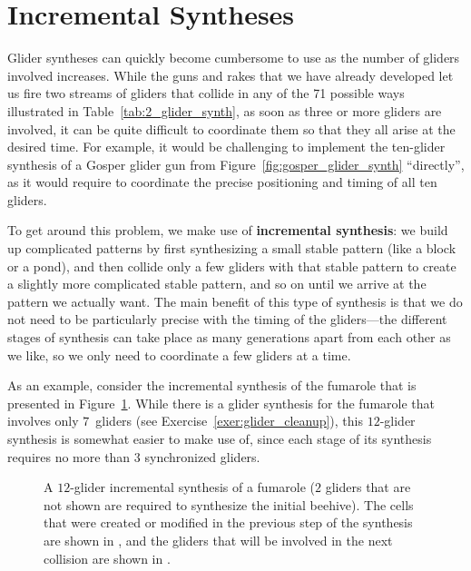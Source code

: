 \section{Incremental Syntheses}\label{sec:incremental_synthesis}

Glider syntheses can quickly become cumbersome to use as the number of gliders involved increases. While the guns and rakes that we have already developed let us fire two streams of gliders that collide in any of the 71 possible ways illustrated in Table~\ref{tab:2_glider_synth}, as soon as three or more gliders are involved, it can be quite difficult to coordinate them so that they all arise at the desired time. For example, it would be challenging to implement the ten-glider synthesis of a Gosper glider gun from Figure~\ref{fig:gosper_glider_synth} ``directly'', as it would require to coordinate the precise positioning and timing of all ten gliders.

To get around this problem, we make use of \textbf{incremental synthesis}: we build up complicated patterns by first synthesizing a small stable pattern (like a block or a pond), and then collide only a few gliders with that stable pattern to create a slightly more complicated stable pattern, and so on until we arrive at the pattern we actually want. The main benefit of this type of synthesis is that we do not need to be particularly precise with the timing of the gliders---the different stages of synthesis can take place as many generations apart from each other as we like, so we only need to coordinate a few gliders at a time.

As an example, consider the incremental synthesis of the fumarole that is presented in Figure~\ref{fig:fumarole_sequential}. While there is a glider synthesis for the fumarole that involves only $7$~gliders (see Exercise~\ref{exer:glider_cleanup}), this $12$-glider synthesis is somewhat easier to make use of, since each stage of its synthesis requires no more than $3$ synchronized gliders.

\begin{figure}[!htb]
	\centering{}
	\caption{A $12$-glider incremental synthesis of a fumarole ($2$ gliders that are not shown are required to synthesize the initial beehive). The cells that were created or modified in the previous step of the synthesis are shown in , and the gliders that will be involved in the next collision are shown in .}\label{fig:fumarole_sequential}
\end{figure}

